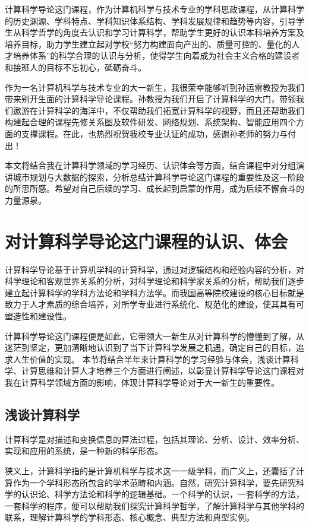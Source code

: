 \documentclass{article}
\begin{document}
计算科学导论这门课程，作为计算机科学与技术专业的学科思政课程，从计算科学的历史渊源、学科特点、学科知识体系结构、学科发展规律和趋势等内容，引导学生从科学哲学的角度去认识和学习计算科学，帮助学生更好的认识本科培养方案及培养目标，助力学生建立起对学校“努力构建面向产出的、质量可控的、量化的人才培养体系”的科学合理的认识与分析，使得学生向着成为社会主义合格的建设者和接班人的目标不忘初心，砥砺奋斗。

作为一名计算机科学与技术专业的大一新生，我很荣幸能够听到孙运雷教授为我们带来别开生面的计算科学导论课程。孙教授为我们开启了计算科学的大门，带领我们遨游在计算科学的海洋中，不仅帮助我们拓宽计算科学的视野，而且还帮助我们构建起合理的课程先修关系图及软件研发、网络规划、系统架构、智能应用四个方面的支撑课程。在此，也热烈祝贺我校专业认证的成功，感谢孙老师的努力与付出！

本文将结合我在计算科学领域的学习经历、认识体会等方面，结合课程中对分组演讲城市规划与大数据的探索，分析总结计算科学导论这门课程的重要性及这一阶段的所思所感。希望对自己后续的学习、成长起到启蒙的作用，成为后续不懈奋斗的力量源泉。

\section{对计算科学导论这门课程的认识、体会}

计算科学导论基于计算机学科的计算科学，通过对逻辑结构和经验内容的分析，对科学理论和客观世界关系的分析，对科学理论和科学家关系的分析，帮助我们逐步建立起计算科学的学科方法论和学科方法学。而我国高等院校建设的核心目标就是致力于人才素质的综合培养，对所学专业进行系统化、规范化的建设，使其具有可塑造性和建设性。

计算科学导论这门课程便是如此，它带领大一新生从对计算科学的懵懂到了解，从迷茫到坚定，更加清晰地认识到了当下计算科学发展之机遇，确定自己的目标，追求人生价值的实现。
本节将结合半年来计算科学的学习经验与体会，浅谈计算科学、计算思维和计算人才培养三个方面进行阐述，以彰显计算科学导论这门课程对我在计算科学领域方面的影响，体现计算科学导论对于大一新生的重要性。

\subsection{浅谈计算科学}

计算科学是对描述和变换信息的算法过程，包括其理论、分析、设计、效率分析、实现和应用的系统，是一种新的科学形态。

狭义上，计算科学指的是计算机科学与技术这一一级学科，而广义上，还囊括了计算作为一个学科形态所包含的学术范畴和内涵。自然，研究计算科学，要先研究科学的认识论、科学方法论和科学的逻辑基础。一个科学的认识，一套科学的方法，一套科学的程序，便可以帮助我们探究计算科学哲学，了解计算科学与其他学科的联系，理解计算科学的学科形态、核心概念、典型方法和典型实例。
\end{document}
